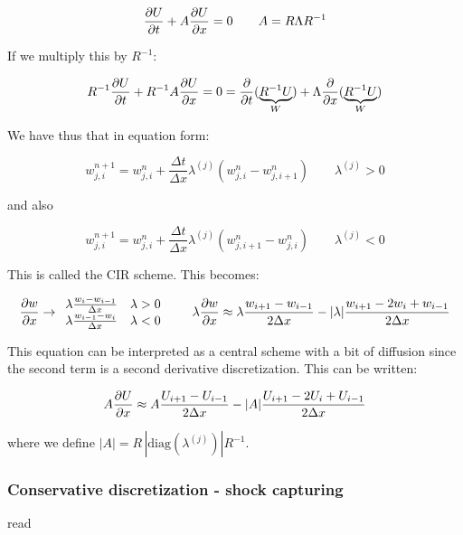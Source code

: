 \begin{equation}
\frac{\partial U}{\partial t}+ A\frac{\partial U}{\partial x} = 0 \qquad A = R\Lambda R^{-1}
\end{equation}

If we multiply this by $R^{-1}$: 

\begin{equation}
R^{-1}\frac{\partial U}{\partial t}+ R^{-1}A\frac{\partial U}{\partial x} = 0 = \frac{\partial}{\partial t} (\underbrace{R^{-1}U}_{W}) + \Lambda \frac{\partial}{\partial x} (\underbrace{R^{-1}U}_{W})
\end{equation}

We have thus that in equation form: 

\begin{equation}
w_{j,i}^{n+1}= w_{j,i}^{n} + \frac{\Delta t}{\Delta x} \lambda ^{(j)}(w_{j,i}^{n} - w_{j,i+1}^{n}) \qquad \lambda ^{(j)}>0
\end{equation}

and also 

\begin{equation}
w_{j,i}^{n+1}= w_{j,i}^{n} + \frac{\Delta t}{\Delta x} \lambda ^{(j)}(w_{j,i+1}^{n} - w_{j,i}^{n}) \qquad \lambda ^{(j)}<0
\end{equation}

This is called the CIR scheme. This becomes: 

\begin{equation}
\frac{\partial w}{\partial x} \rightarrow \begin{array}{c}
\lambda \frac{w_i - w_{i-1}}{\Delta x} \quad \lambda > 0\\
\lambda \frac{w_{i-1} - w_{i}}{\Delta x} \quad \lambda < 0
\end{array}
\qquad \lambda \frac{\partial w}{\partial x} \approx \lambda \frac{w_{i+1}-w_{i-1}}{2\Delta x} - |\lambda|\frac{w_{i+1}-2w_i + w_{i-1}}{2\Delta x} 
\end{equation}

This equation can be interpreted as a central scheme with a bit of diffusion since the second term is a second derivative discretization. This can be written: 

\begin{equation}
A \frac{\partial U}{\partial x} \approx A\frac{U_{i+1}-U_{i-1}}{2\Delta x} - |A|\frac{U_{i+1}-2U_i + U_{i-1}}{2\Delta x} 
\end{equation}

where we define $|A| = R \, |\mbox{diag}(\lambda ^{(j)})| R^{-1}$.

\subsubsection{Conservative discretization - shock capturing}
read

